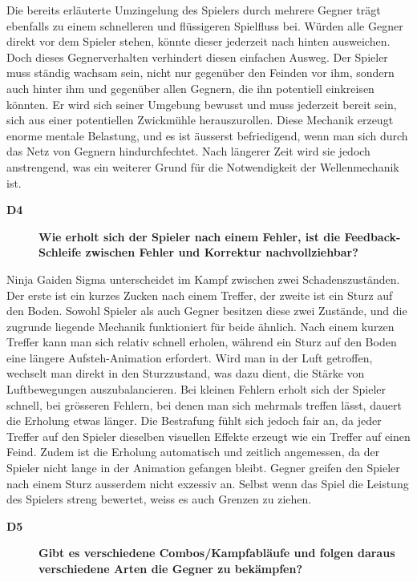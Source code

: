 \documentclass[../Main.tex]{subfiles}
\begin{document}
Die bereits erläuterte Umzingelung des Spielers durch mehrere Gegner trägt ebenfalls zu einem schnelleren und flüssigeren Spielfluss bei. Würden alle Gegner direkt vor dem Spieler stehen, könnte dieser jederzeit nach hinten ausweichen. Doch dieses Gegnerverhalten verhindert diesen einfachen Ausweg. Der Spieler muss ständig wachsam sein, nicht nur gegenüber den Feinden vor ihm, sondern auch hinter ihm und gegenüber allen Gegnern, die ihn potentiell einkreisen könnten. Er wird sich seiner Umgebung bewusst und muss jederzeit bereit sein, sich aus einer potentiellen Zwickmühle herauszurollen. Diese Mechanik erzeugt enorme mentale Belastung, und es ist äusserst befriedigend, wenn man sich durch das Netz von Gegnern hindurchfechtet. Nach längerer Zeit wird sie jedoch anstrengend, was ein weiterer Grund für die Notwendigkeit der Wellenmechanik ist.

\begin{description}
  \item[\textbf{D4}] \textbf{Wie erholt sich der Spieler nach einem Fehler, ist die Feedback-Schleife zwischen Fehler und Korrektur nachvollziehbar?}
\end{description}

Ninja Gaiden Sigma unterscheidet im Kampf zwischen zwei Schadenszuständen. Der erste ist ein kurzes Zucken nach einem Treffer, der zweite ist ein Sturz auf den Boden. Sowohl Spieler als auch Gegner besitzen diese zwei Zustände, und die zugrunde liegende Mechanik funktioniert für beide ähnlich. Nach einem kurzen Treffer kann man sich relativ schnell erholen, während ein Sturz auf den Boden eine längere Aufsteh-Animation erfordert. Wird man in der Luft getroffen, wechselt man direkt in den Sturzzustand, was dazu dient, die Stärke von Luftbewegungen auszubalancieren. Bei kleinen Fehlern erholt sich der Spieler schnell, bei grösseren Fehlern, bei denen man sich mehrmals treffen lässt, dauert die Erholung etwas länger. Die Bestrafung fühlt sich jedoch fair an, da jeder Treffer auf den Spieler dieselben visuellen Effekte erzeugt wie ein Treffer auf einen Feind. Zudem ist die Erholung automatisch und zeitlich angemessen, da der Spieler nicht lange in der Animation gefangen bleibt. Gegner greifen den Spieler nach einem Sturz ausserdem nicht exzessiv an. Selbst wenn das Spiel die Leistung des Spielers streng bewertet, weiss es auch Grenzen zu ziehen.

\begin{description}
  \item[\textbf{D5}] \textbf{Gibt es verschiedene Combos/Kampfabläufe und folgen daraus verschiedene Arten die Gegner zu bekämpfen?}
\end{description}
\end{document}
